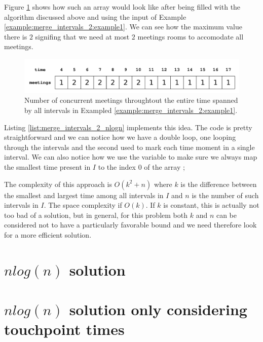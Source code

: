 Figure \ref{fig:merge_intervals_2:example1} shows how such an array would look like after being filled with the algorithm discussed above and using the input of Example \ref{example:merge_intervals_2:example1}. We can see how the maximum value there is $2$ signifing that we need at most $2$ meetings rooms to accomodate all meetings.
\begin{figure}
	\centering
	\includegraphics[width=\textwidth]{sources/merge_intervals_2/images/example2_meetings}
	\caption[]{Number of concurrent meetings throughtout the entire time spanned by all intervals in Exampled \ref{example:merge_intervals_2:example1}.}
	\label{fig:merge_intervals_2:example1}
\end{figure}

Listing \ref{list:merge_intervals_2_nlogn} implements this idea. The code is pretty straightforward and we can notice how we have a double loop, one looping through the intervals and the second used to mark each time moment in a single interval. We can also notice how we use the variable  to make sure we always map the smallest time present in $I$ to the index $0$ of the array ;  



The complexity of this approach is $O(k^2 + n)$ where $k$ is the difference between the smallest and largest time among all intervals in $I$ and $n$ is the number of such intervals in $I$. The space complexity if $O(k)$.
If $k$ is constant, this is actually not too bad of a solution, but in general, for this problem both $k$ and $n$ can be considered not to have a particularly favorable bound and we need therefore look for a more efficient solution.

\section{$nlog(n)$ solution}




\section{$nlog(n)$ solution only considering touchpoint times}
